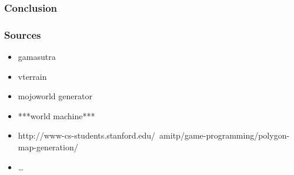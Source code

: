 \documentclass{beamer}
\begin{document}
\begin{frame}
  \frametitle{Conclusion}
\end{frame}

\begin{frame}
  \frametitle{Sources}
  \begin{itemize}
  \item gamasutra
  \item vterrain
  \item mojoworld generator
  \item ***world machine***
  \item http://www-cs-students.stanford.edu/~amitp/game-programming/polygon-map-generation/
  \item \dots
  \end{itemize}
\end{frame}
\end{document}
